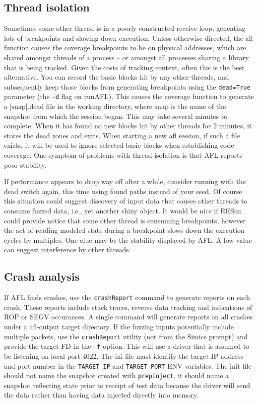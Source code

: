 \documentclass[titlepage]{article}
\begin{document}
\subsection{Thread isolation}
Sometimes some other thread is in a poorly constructed receive loop, geneating lots of breakpoints and slowing down execution.
Unless otherwise directed, the afl function causes the coverage breakpoints to be on physical addresses, which are shared amongst threads of a process -- or amongst
all processes sharing a library that is being tracked.  Given the costs
of tracking context, often this is the best alternative.  You can record the basic blocks hit by any other threads, and subsequently keep those blocks from generating
breakpoints using the {\tt dead=True} parameter (the {\tt -d} flag on runAFL).  This causes the coverage function to generate a [snap].dead file in the working directory, where snap is the
name of the snapshot from which the session began.  This may take several minutes to complete.  When it has found no new blocks hit by other threads for 2 minutes, it stores the
dead zones and exits. When starting a new afl session, if such a file exists, it will be used to ignore selected basic blocks
when establishing code coverage.  One symptom of problems with thread isolation is that AFL reports poor stability.

If performance appears to drop way off after a while, consider running with the dead switch again, this time using found paths instead of your seed.  Of course
this situation could suggest discovery of input data that causes other threads to consume fuzzed data, i.e., yet another shiny object.
It would be nice if RESim could provide notice that some other thread is consuming breakpoints, however the act of reading modeled state during a 
breakpoint slows down the execution cycles by multiples.  One clue may be the stability displayed by AFL.  A low value can suggest interference by other threads.

\subsection{Crash analysis}
If AFL finds crashes, use the {\tt crashReport} command to generate reports on each crash.  These reports include stack traces, reverse
data tracking and indications of ROP or SEGV occurances.  A single command will generate reports on all crashes under a afl-output target
directory.  If the fuzzing inputs potentially include multiple packets, use the {\tt crashReport} utility (not from the Simics prompt) and provide
the target FD in the {\tt -f} option.  This will use a driver that is assumed to be listening on local port 4022.  The ini file must identify the target IP
address and port number in the {\tt TARGET\_IP} and {\tt TARGET\_PORT} ENV variables.  The init file should not name the snapshot created with {\tt prepInject},
it should name a snapshot reflecting state prior to receipt of test data because the driver will send the data rather than having data injected directly into 
memory.
\end{document}
